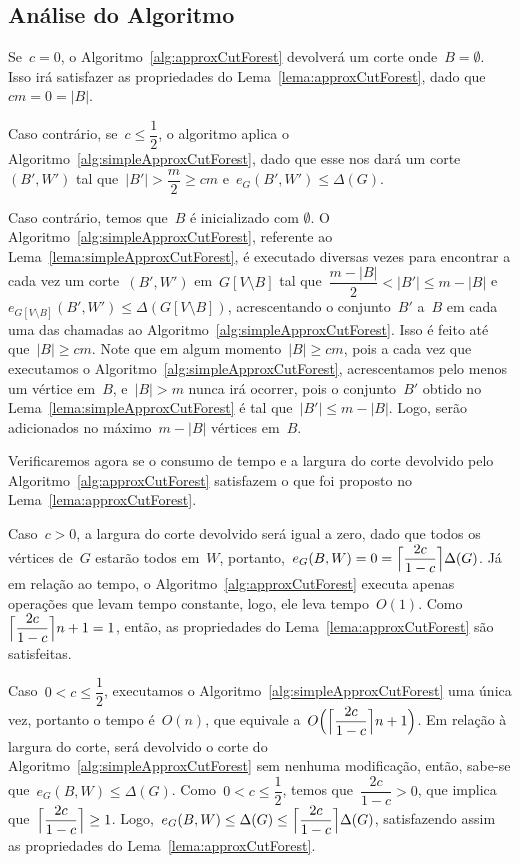 \bigskip
\bigskip
\bigskip

\subsection*{Análise do Algoritmo}

	Se~$c=0$, o Algoritmo~\ref{alg:approxCutForest} devolverá
	um corte onde~$B=\emptyset$. Isso irá satisfazer as 
	propriedades do Lema~\ref{lema:approxCutForest}, dado 
	que~$cm=0=|B|$.

	Caso contrário, se~$c \le \dfrac{1}{2}$, o algoritmo aplica o 
	Algoritmo~\ref{alg:simpleApproxCutForest}, dado que esse 
	nos dará um corte~$(B',W')$ tal 
	que~$|B'|>\dfrac{m}{2}\ge cm$ e~${e_G(B',W')\le \Delta(G)}$.

	Caso contrário, temos que~$B$ é inicializado com $\emptyset$.
	O Algoritmo~\ref{alg:simpleApproxCutForest}, 
	referente ao Lema~\ref{lema:simpleApproxCutForest}, é
	executado diversas vezes para encontrar a cada vez
	um corte~$(B',W')$ em~${G[V\setminus B]}$ 
	tal que~${\dfrac{m-|B|}{2}<|B'|\le m-|B|}$ 
	e~${e_{G[V\setminus B]}(B',W')\le\Delta(G[V\setminus B])}$, 
	acrescentando o 
	conjunto~$B'$ a~$B$ em cada uma das chamadas ao 
	Algoritmo~\ref{alg:simpleApproxCutForest}.
	Isso é feito até que~${|B|\ge cm}$.
	Note que em algum momento~$|B|\ge cm$, pois a 
	cada vez que executamos o 
	Algoritmo~\ref{alg:simpleApproxCutForest}, acrescentamos pelo 
	menos um vértice em~$B$, e~${|B|>m}$ nunca irá ocorrer, pois o 
	conjunto~$B'$ obtido no Lema~\ref{lema:simpleApproxCutForest} 
	é tal que~$|B'|\le m-|B|$. Logo, serão adicionados no 
	máximo~${m-|B|}$ vértices em~$B$.
	
	\bigskip
	\bigskip
	
	Verificaremos agora se o consumo de tempo e a largura do corte
	devolvido pelo Algoritmo~\ref{alg:approxCutForest} satisfazem
	o que foi proposto no Lema~\ref{lema:approxCutForest}.
	
	Caso~$c>0$, a largura do corte devolvido será igual a zero,
	dado que todos os vértices de~$G$ estarão todos em~$W$,
	portanto,~${e_G(B,W)=0=\ceil[\Big]{\dfrac{2c}{1-c}} \Delta(G)}$.
	Já em relação ao tempo, o Algoritmo~\ref{alg:approxCutForest}
	executa apenas operações que levam tempo constante, logo, ele
	leva tempo~$O(1)$. 
	Como~$\ceil[\Big]{\dfrac{2c}{1-c}} n+1 = 1$, então,
	as propriedades do Lema~\ref{lema:approxCutForest} são
	satisfeitas.

	Caso~$0<c\le \dfrac{1}{2}$, executamos o
	Algoritmo~\ref{alg:simpleApproxCutForest} uma única vez, 
	portanto o tempo é~$O(n)$, que equivale 
	a~${O\Big(\ceil[\Big]{\dfrac{2c}{1-c}} n+1\Big)}$.
	Em relação à largura do corte, será devolvido o corte do 
	Algoritmo~\ref{alg:simpleApproxCutForest} sem nenhuma 
	modificação, então, sabe-se que~${e_G(B,W)\le \Delta(G)}$.
	Como~${0<c\le\dfrac{1}{2}}$, temos que~${\dfrac{2c}{1-c}>0}$, 
	que implica que~${\ceil[\Big]{ \dfrac{2c}{1-c}}\ge 1}$.
	Logo,~${e_G(B,W)\le\Delta(G)\le \ceil[\Big]{\dfrac{2c}{1-c}}
	\Delta(G)}$, 
	satisfazendo assim as propriedades do 
	Lema~\ref{lema:approxCutForest}.

